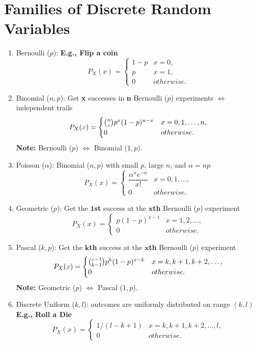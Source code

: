 \section{Families of Discrete Random Variables}
\begin{enumerate}
    \item Bernoulli ($p$): \textbf{E.g., Flip a coin}{
        \[ P_X(x) =
        \begin{cases}
            1-p & x=0, \\
            p   & x=1, \\
            0   & otherwise.
        \end{cases} \]
    }
    \item Binomial ($n, p$): Get \textbf{x} successes in \textbf{n} Bernoulli ($p$) experiments $\iff$ independent trails{
        \[P_X(\textcolor{red}{x}) = {
            \begin{cases}
                \binom{n}{\textcolor{red}{x}}p^x(1-p)^{n-x} & x=0,1,\ldots,n, \\
                0 & otherwise.
            \end{cases}
        }\]
        \textbf{Note:} Bernoulli ($p$) $\iff$ Binomial ($1, p$).
    }
    \item Poisson ($\alpha$): Binomial ($n, p$) with small $p$, large $n$, and $\alpha=np${
        \[ P_X(x) =
        \begin{cases}
            \dfrac{\alpha^x e^{-\alpha}}{x!}   & x=0,1,\ldots, \\
            0   & otherwise.
        \end{cases} \]
    }
    \item Geometric ($p$): Get the $\bm{1}$\textbf{st} success at the $\bm{x}$\textbf{th} Bernoulli ($p$) experiment {
        \[ P_X(x) =
        \begin{cases}
            p(1-p)^{x-1} & x=1,2,\ldots, \\
            0   & otherwise.
        \end{cases} \]
    }
    \item Pascal ($k,p$): Get the $\bm{k}$\textbf{th} success at the $\bm{x}$\textbf{th} Bernoulli ($p$) experiment {
        \[P_X(\textcolor{red}{x}) = {
            \begin{cases}
                \binom{\textcolor{red}{x}-1}{k-1}p^k(1-p)^{x-k} & x=k,k+1,k+2,\ldots, \\
                0 & otherwise.
            \end{cases}
        }\]
        \textbf{Note:} Geometric ($p$) $\iff$ Pascal ($1, p$).
    }
    \item Discrete Uniform ($k, l$): outcomes are uniformly distributed on range $(k, l)$ \textbf{E.g., Roll a Die}{
        \[ P_X(x) =
        \begin{cases}
            1/(l-k+1)   & x=k,k+1,k+2,\ldots,l, \\
            0   & otherwise.
        \end{cases} \]
    }
\end{enumerate}

